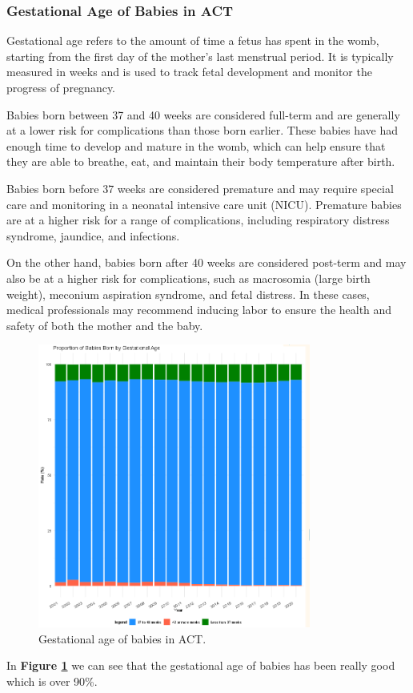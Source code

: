 \subsubsection{Gestational Age of Babies in ACT}
Gestational age refers to the amount of time a fetus has spent in the womb, starting from the first day of the mother's last menstrual period. It is typically measured in weeks and is used to track fetal development and monitor the progress of pregnancy.

Babies born between 37 and 40 weeks are considered full-term and are generally at a lower risk for complications than those born earlier. These babies have had enough time to develop and mature in the womb, which can help ensure that they are able to breathe, eat, and maintain their body temperature after birth.

Babies born before 37 weeks are considered premature and may require special care and monitoring in a neonatal intensive care unit (NICU). Premature babies are at a higher risk for a range of complications, including respiratory distress syndrome, jaundice, and infections.

On the other hand, babies born after 40 weeks are considered post-term and may also be at a higher risk for complications, such as macrosomia (large birth weight), meconium aspiration syndrome, and fetal distress. In these cases, medical professionals may recommend inducing labor to ensure the health and safety of both the mother and the baby.

\begin{figure}
  \centering
  \includegraphics[width=0.8\textwidth]{subsections/baby_health/gestational_age_act.png}
  \caption{Gestational age of babies in ACT.}
  \label{fig:gest_act}
\end{figure}

In \textbf{Figure \ref{fig:gest_act}} we can see that the gestational age of babies has been really good which is over 90\%.